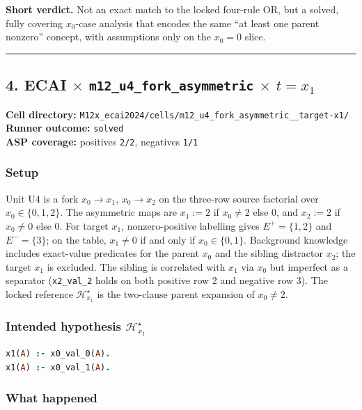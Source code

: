 \documentclass[11pt]{article}
\begin{document}
\textbf{Short verdict.} Not an exact match to the locked four-rule OR, but a solved, fully covering \(x_0\)-case analysis that encodes the same ``at least one parent nonzero'' concept, with assumptions only on the \(x_0=0\) slice.

\medskip\hrule\medskip

\subsection{\texorpdfstring{4. ECAI \(\times\) \texttt{m12\_u4\_fork\_asymmetric} \(\times\) \(t=x_1\)}{4. ECAI - m12-u4-fork-asymmetric - target x1}}

\textbf{Cell directory:} \texttt{M12x\_ecai2024/cells/m12\_u4\_fork\_asymmetric\_\_target-x1/}\\
\textbf{Runner outcome:} \texttt{solved}\\
\textbf{ASP coverage:} positives \texttt{2/2}, negatives \texttt{1/1}

\subsubsection{Setup}

Unit U4 is a fork \(x_0\to x_1\), \(x_0\to x_2\) on the three-row source factorial over \(x_0\in\{0,1,2\}\). The asymmetric maps are \(x_1:=2\) if \(x_0\neq 2\) else \(0\), and \(x_2:=2\) if \(x_0\neq 0\) else \(0\). For target \(x_1\), nonzero-positive labelling gives \(E^+=\{1,2\}\) and \(E^-=\{3\}\); on the table, \(x_1\neq 0\) if and only if \(x_0\in\{0,1\}\). Background knowledge includes exact-value predicates for the parent \(x_0\) and the sibling distractor \(x_2\); the target \(x_1\) is excluded. The sibling is correlated with \(x_1\) via \(x_0\) but imperfect as a separator (\texttt{x2\_val\_2} holds on both positive row 2 and negative row 3). The locked reference \(\mathcal{H}_{x_1}^\star\) is the two-clause parent expansion of \(x_0\neq 2\).

\subsubsection{\texorpdfstring{Intended hypothesis \(\mathcal{H}_{x_1}^\star\)}{Intended hypothesis H-star(x1)}}

\begin{lstlisting}[style=logic,language=Prolog]
x1(A) :- x0_val_0(A).
x1(A) :- x0_val_1(A).
\end{lstlisting}

\subsubsection{What happened}
\end{document}
